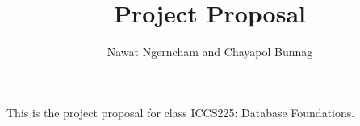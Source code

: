\documentclass{article}
\author{Nawat Ngerncham and Chayapol Bunnag}
\title{Project Proposal}
\begin{document}
\maketitle

This is the project proposal for class ICCS225: Database Foundations.
\end{document}
